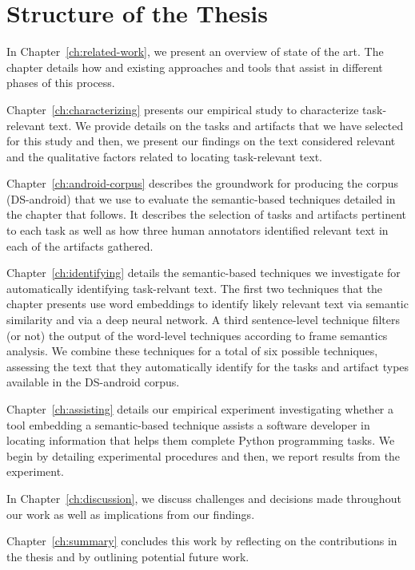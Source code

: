 \section{Structure of the Thesis}
\label{cp1:organization}



In Chapter~\ref{ch:related-work}, we present an overview of state of the art. The chapter details 
how  and existing approaches and tools 
that assist in different phases of this process.


Chapter~\ref{ch:characterizing} presents our empirical study to characterize task-relevant text.
We provide details on the tasks and artifacts that we have selected for this study
and then, we present our findings on the text considered relevant 
and the qualitative factors related to locating task-relevant text.


Chapter~\ref{ch:android-corpus} describes the groundwork 
for producing the corpus (\acs{DS-android}) that we use to evaluate the semantic-based techniques 
detailed in the chapter that follows. It describes the selection of tasks 
and 
artifacts pertinent to each task 
as well as how three human annotators identified relevant text in each of the artifacts gathered.


Chapter~\ref{ch:identifying} details the semantic-based techniques we investigate for automatically 
identifying task-relvant text.
The first two techniques that the chapter presents 
use word embeddings to identify likely relevant text via semantic similarity
and via a deep neural network.
A third sentence-level technique filters (or not) 
the output of the word-level techniques according to frame semantics analysis.
We combine these techniques for a total of six possible techniques, 
assessing 
the text that they automatically identify for the tasks and artifact types
available in the \acs{DS-android} corpus.




Chapter~\ref{ch:assisting} details our empirical experiment investigating 
whether a tool embedding a semantic-based technique assists a software developer in locating information
that helps them complete Python programming tasks. We begin by detailing experimental procedures
and then, we report results from the experiment.


In Chapter~\ref{ch:discussion}, we discuss challenges and decisions 
made throughout our work 
as well as implications from our findings. 


Chapter~\ref{ch:summary} concludes this work by reflecting on the contributions in the thesis
and by outlining  potential future work. 
